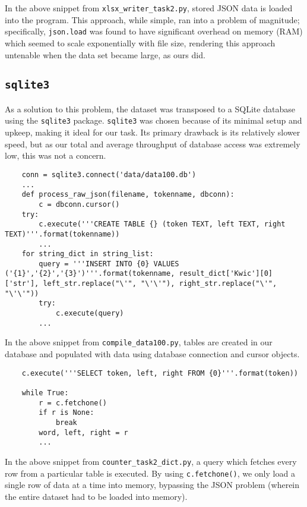 \documentclass{article}      %
\begin{document}
	In the above snippet from \texttt{xlsx\_writer\_task2.py}, stored JSON data is loaded into the program. This approach, while simple, ran into a problem of magnitude; specifically, \texttt{json.load} was found to have significant overhead on memory (RAM) which seemed to scale exponentially with file size, rendering this approach untenable when the data set became large, as ours did.
	
	\subsection{\texttt{sqlite3}}
	
	As a solution to this problem, the dataset was transposed to a SQLite database using the \texttt{sqlite3} package. \texttt{sqlite3} was chosen because of its minimal setup and upkeep, making it ideal for our task. Its primary drawback is its relatively slower speed, but as our total and average throughput of database access was extremely low, this was not a concern.
	
	\begin{verbatim}
	conn = sqlite3.connect('data/data100.db')
	...
	def process_raw_json(filename, tokenname, dbconn):
		c = dbconn.cursor()
	try:
		c.execute('''CREATE TABLE {} (token TEXT, left TEXT, right TEXT)'''.format(tokenname))
		...
	for string_dict in string_list:
		query = '''INSERT INTO {0} VALUES ('{1}','{2}','{3}')'''.format(tokenname, result_dict['Kwic'][0]['str'], left_str.replace("\'", "\'\'"), right_str.replace("\'", "\'\'"))
		try:
			c.execute(query)
		...
	\end{verbatim}
	
	In the above snippet from \texttt{compile\_data100.py}, tables are created in our database and populated with data using database connection and cursor objects.
	
	\begin{verbatim}
	c.execute('''SELECT token, left, right FROM {0}'''.format(token))
	
	while True:
		r = c.fetchone()
		if r is None:
			break
		word, left, right = r
		...
	\end{verbatim}
	
	In the above snippet from \texttt{counter\_task2\_dict.py}, a query which fetches every row from a particular table is executed. By using \texttt{c.fetchone()}, we only load a single row of data at a time into memory, bypassing the JSON problem (wherein the entire dataset had to be loaded into memory).
	
\end{document}
